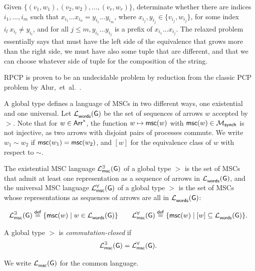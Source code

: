 \begin{definition}
Given $\{(v_1, w_1), (v_2, w_2), ..., (v_r, w_r)\}$, determinate whether there are indices $i_1, ..., i_m$
such that $x_{i_1}...x_{i_n}=y_{i_1}...y_{i_m}$, where $x_{i_j}, y_{i_j} \in \{v_{i_j},w_{i_j}\}$, for some
index $i_l \  x_{i_l}\neq y_{i_l}$, and for all $j\leq m,y_{i_1}...y_{i_j}$ is a prefix of $x_{i_1}...x_{i_j}$.
The relaxed problem essentially says that must have the left side of the equivalence that grows more than the right side,
we must have also some tuple that are different, and that we can choose whatever side of tuple for the composition
of the string.
\end{definition}

RPCP is proven to be an undecidable problem by reduction from the classic
PCP problem by Alur,~et~al.~\cite{alur2005realizability}.

A global type defines a language of MSCs in two different ways, one  
existential and one universal. Let $\mathcal{L}_{\mathsf{words}}^{}(\mathsf{G})$ be the set of  
sequences of arrows $w$ accepted by $\gt$. Note that for $w \in \mathsf{Arr}^*$,  
the function $w \mapsto \mathsf{msc}(w)$ with  
$\mathsf{msc}(w) \in \mathcal{M}_{\mathsf{synch}}$ is not injective, as two  
arrows with disjoint pairs of processes commute. We write $w_1 \sim w_2$ if  
$\mathsf{msc}(w_1) = \mathsf{msc}(w_2)$, and $[w]$ for the equivalence class  
of $w$ with respect to $\sim$.  

The existential MSC language $\mathcal{L}_{\mathsf{msc}}^{\exists}(\mathsf{G}){}$ of a global  
type $\gt$ is the set of MSCs that admit at least one representation as a  
sequence of arrows in $\mathcal{L}_{\mathsf{words}}^{}(\mathsf{G})$, and the universal MSC  
language $\mathcal{L}_{\mathsf{msc}}^{\forall}(\mathsf{G})$ of a global type $\gt$ is the set of  
MSCs whose representations as sequences of arrows are all in  
$\mathcal{L}_{\mathsf{words}}^{}(\mathsf{G})$:  

$$
\mathcal{L}_{\mathsf{msc}}^{\exists}(\mathsf{G}) \stackrel{\mathsf{def}}{=} \{\mathsf{msc}(w) \mid 
w \in \mathcal{L}_{\mathsf{words}}^{}(\mathsf{G})\} \qquad
\mathcal{L}_{\mathsf{msc}}^{\forall}(\mathsf{G}) \stackrel{\mathsf{def}}{=} \{\mathsf{msc}(w) \mid 
[w] \subseteq \mathcal{L}_{\mathsf{words}}^{}(\mathsf{G})\}.
$$

\begin{definition}
    A global type $\gt$ is \emph{commutation-closed} if
    $$
    \mathcal{L}_{\mathsf{msc}}^{\exists}(\mathsf{G}) = \mathcal{L}_{\mathsf{msc}}^{\forall}(\mathsf{G}).
    $$
\end{definition}

We write $\mathcal{L}_{\mathsf{msc}}^{}(\mathsf{G})$ for the common language.


